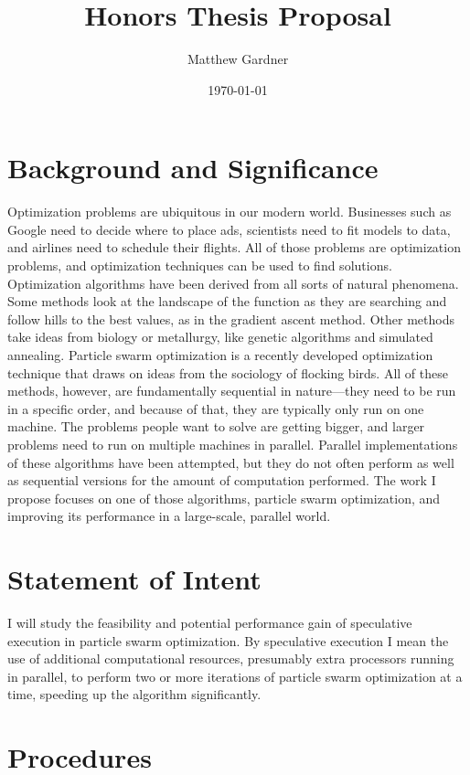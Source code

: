 \documentclass[onecolumn, 12pt]{article}
\title{Honors Thesis Proposal}
\author{Matthew Gardner}
\date{\today}
\begin{document}
\maketitle

\section{Background and Significance}

Optimization problems are ubiquitous in our modern world.  Businesses such as
Google need to decide where to place ads, scientists need to fit models to
data, and airlines need to schedule their flights.  All of those problems are
optimization problems, and optimization techniques can be used to find
solutions.  Optimization algorithms have been derived from all sorts of natural
phenomena.  Some methods look at the landscape of the function as they are
searching and follow hills to the best values, as in the gradient ascent
method.  Other methods take ideas from biology or metallurgy, like genetic
algorithms and simulated annealing.  Particle swarm optimization is a recently
developed optimization technique that draws on ideas from the sociology of
flocking birds.  All of these methods, however, are fundamentally sequential in
nature---they need to be run in a specific order, and because of that, they are
typically only run on one machine.  The problems people want to solve are
getting bigger, and larger problems need to run on multiple machines in
parallel.  Parallel implementations of these algorithms have been attempted,
but they do not often perform as well as sequential versions for the amount of
computation performed.  The work I propose focuses on one of those algorithms,
particle swarm optimization, and improving its performance in a large-scale,
parallel world.

\section{Statement of Intent}

I will study the feasibility and potential performance gain of speculative
execution in particle swarm optimization.  By speculative execution I mean the
use of additional computational resources, presumably extra processors running
in parallel, to perform two or more iterations of particle swarm optimization
at a time, speeding up the algorithm significantly.

\section{Procedures}
\end{document}
